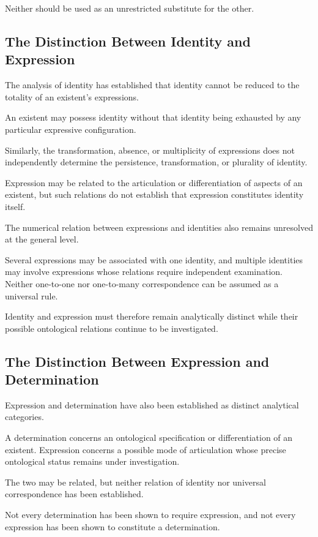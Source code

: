 Neither should be used as an unrestricted substitute
for the other.

\subsection{The Distinction Between Identity and Expression}

The analysis of identity has established that identity
cannot be reduced to the totality of an existent's
expressions.

An existent may possess identity without that identity
being exhausted by any particular expressive configuration.

Similarly, the transformation, absence, or multiplicity
of expressions does not independently determine
the persistence, transformation, or plurality of identity.

Expression may be related to the articulation or
differentiation of aspects of an existent, but such
relations do not establish that expression constitutes
identity itself.

The numerical relation between expressions and identities
also remains unresolved at the general level.

Several expressions may be associated with one identity,
and multiple identities may involve expressions whose
relations require independent examination. Neither
one-to-one nor one-to-many correspondence can be
assumed as a universal rule.

Identity and expression must therefore remain
analytically distinct while their possible ontological
relations continue to be investigated.

\subsection{The Distinction Between Expression and Determination}

Expression and determination have also been established
as distinct analytical categories.

A determination concerns an ontological specification
or differentiation of an existent. Expression concerns
a possible mode of articulation whose precise ontological
status remains under investigation.

The two may be related, but neither relation of identity
nor universal correspondence has been established.

Not every determination has been shown to require
expression, and not every expression has been shown
to constitute a determination.

